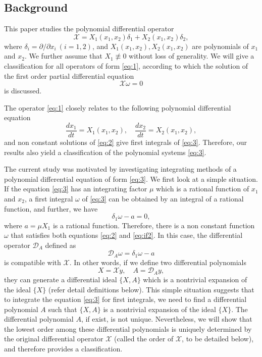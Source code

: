 \documentclass[preprint,12pt]{elsarticle}
\begin{document}
\subsection{Background}
This paper studies the polynomial differential operator
\begin{equation}
\label{eq:1}
\mathscr{X}  = X_1(x_1,x_2)\delta_1 + X_2(x_1,x_2)\delta_2,
\end{equation}
where $\delta_i  = \partial/\partial x_i\ (i=1,2)$, and $X_1(x_1,x_2), X_2(x_1,x_2)$ are polynomials of $x_1$ and $x_2$.  We further assume that $X_1\not\equiv 0$ without loss of generality. We will give a classification for all operators of form \eqref{eq:1}, according to which the solution of the first order partial differential equation
\begin{equation}
\label{eq:2}
\mathscr{X}\omega = 0
\end{equation}
is discussed. 

The operator \eqref{eq:1} closely relates to the following polynomial differential equation
\begin{equation}
\label{eq:3}
\dfrac{d x_1}{dt} = X_1(x_1,x_2),\quad \dfrac{d x_2}{dt} = X_2(x_1,x_2), 
\end{equation}
and non constant solutions of \eqref{eq:2} give first integrals of \eqref{eq:3}.  Therefore, our results also yield a classification of the polynomial systems \eqref{eq:3}. 

The current study was motivated by investigating integrating methods of a polynomial differential equation of form \eqref{eq:3}. We first look at a simple situation. 
If the equation \eqref{eq:3} has an integrating factor $\mu$ which is a rational function of $x_1$ and $x_2$, a first integral $\omega$ of \eqref{eq:3} can be obtained by an integral of a rational function, and further, we have
\begin{equation}
\label{eq:if2}
\delta_1 \omega - a = 0,
\end{equation}
where $a = \mu X_1$ is a rational function. Therefore, there is a non constant function $\omega$ that satisfies both equations \eqref{eq:2} and \eqref{eq:if2}. In this case, the differential operator $\mathscr{D}_A$ defined as   
\begin{equation}
\mathscr{D}_A\omega = \delta_1 \omega - a
\end{equation}
is compatible with $\mathscr{X}$. In other words, if we define two differential polynomials 
$$X = \mathscr{X}y,\quad A = \mathscr{D}_Ay,$$
they can generate a differential ideal $\{X,A\}$ which is a nontrivial expansion of the ideal $\{X\}$ (refer detail definitions below). This simple situation suggests that to integrate the equation \eqref{eq:3} for first integrals,  we need  to find a differential polynomial $A$ such that $\{X,A\}$ is a nontrivial expansion of the ideal $\{X\}$. The differential polynomial $A$, if exist, is not unique. Nevertheless, we will show that the lowest order among these differential polynomials is uniquely determined by the original differential operator $\mathscr{X}$ (called the order of $\mathscr{X}$, to be detailed below), and therefore provides a classification. 
\end{document}

